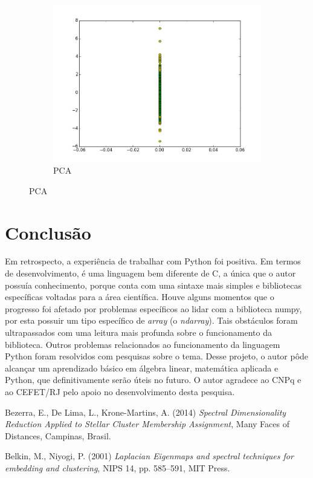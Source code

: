 \documentclass[a4paper,12pt]{article}    %
\begin{document}
\begin{figure}[!ht]
\begin{subfigure}{.45\textwidth}
		\includegraphics[width=\linewidth]{img/15pca.png}
		\caption{PCA}
	\end{subfigure}
	\label{dataset5}
\end{figure}
\vfill
\clearpage

\section{Conclusão}

Em retrospecto, a experiência de trabalhar com Python foi positiva. Em termos de desenvolvimento, é uma linguagem bem diferente de C, a única que o autor possuía conhecimento, porque conta com uma sintaxe mais simples e bibliotecas específicas voltadas para a área científica.
Houve alguns momentos que o progresso foi afetado por problemas específicos ao lidar com a biblioteca numpy, por esta possuir um tipo específico de \textit{array} (o \emph{ndarray}). Tais obstáculos foram ultrapassados com uma leitura mais profunda sobre o funcionamento da biblioteca. Outros problemas relacionados ao funcionamento da linguagem Python foram resolvidos com pesquisas sobre o tema.
Desse projeto, o autor pôde alcançar um aprendizado básico em álgebra linear, matemática aplicada e Python, que definitivamente serão úteis no futuro.
O autor agradece ao CNPq e ao CEFET/RJ pelo apoio no desenvolvimento desta pesquisa.

\begin{thebibliography}{99}

	 Bezerra, E., De Lima, L., Krone-Martins, A. (2014) \emph{Spectral Dimensionality Reduction Applied to Stellar Cluster Membership Assignment}, Many Faces of Distances, Campinas, Brasil.
	
	Belkin, M., Niyogi, P. (2001) \emph{Laplacian Eigenmaps and spectral techniques for embedding and clustering},
	NIPS 14, pp. 585--591, MIT Press.
	
\end{thebibliography}
\end{document}
